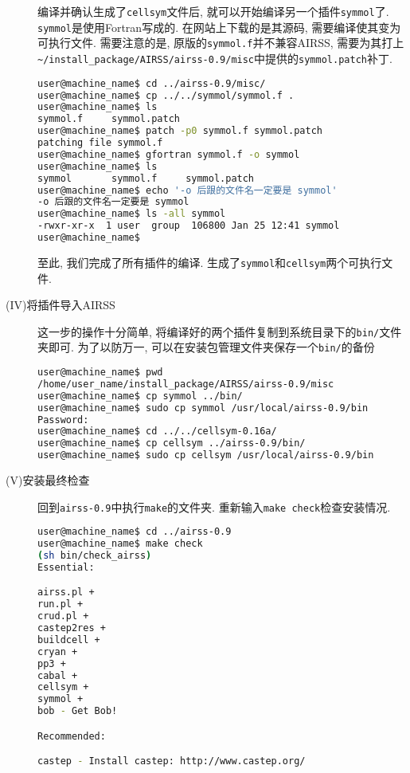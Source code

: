 \documentclass[a4paper, 10pt]{article}
\begin{document}
\begin{description}
        编译并确认生成了\verb|cellsym|文件后, 就可以开始编译另一个插件\verb|symmol|了.
        \verb|symmol|是使用Fortran写成的. 在网站上下载的是其源码, 需要编译使其变为可执行文件.
        需要注意的是, 原版的\verb|symmol.f|并不兼容AIRSS, 需要为其打上\verb|~/install_package/AIRSS/airss-0.9/misc|中提供的\verb|symmol.patch|补丁.
        \begin{lstlisting}[language={bash}]
user@machine_name$ cd ../airss-0.9/misc/
user@machine_name$ cp ../../symmol/symmol.f .
user@machine_name$ ls
symmol.f     symmol.patch
user@machine_name$ patch -p0 symmol.f symmol.patch 
patching file symmol.f
user@machine_name$ gfortran symmol.f -o symmol 
user@machine_name$ ls 
symmol       symmol.f     symmol.patch
user@machine_name$ echo '-o 后跟的文件名一定要是 symmol'
-o 后跟的文件名一定要是 symmol
user@machine_name$ ls -all symmol
-rwxr-xr-x  1 user  group  106800 Jan 25 12:41 symmol
user@machine_name$
        \end{lstlisting}

        至此, 我们完成了所有插件的编译. 生成了\verb|symmol|和\verb|cellsym|两个可执行文件.

        \item[(IV)将插件导入AIRSS]
        这一步的操作十分简单, 将编译好的两个插件复制到系统目录下的\verb|bin/|文件夹即可. 为了以防万一, 可以在安装包管理文件夹保存一个\verb|bin/|的备份
        \begin{lstlisting}[language={bash}]
user@machine_name$ pwd
/home/user_name/install_package/AIRSS/airss-0.9/misc
user@machine_name$ cp symmol ../bin/
user@machine_name$ sudo cp symmol /usr/local/airss-0.9/bin
Password:
user@machine_name$ cd ../../cellsym-0.16a/
user@machine_name$ cp cellsym ../airss-0.9/bin/
user@machine_name$ sudo cp cellsym /usr/local/airss-0.9/bin
        \end{lstlisting}
        
        \item[(V)安装最终检查]
        回到\verb|airss-0.9|中执行\verb|make|的文件夹. 重新输入\verb|make check|检查安装情况.
        \begin{lstlisting}[language={bash}]
user@machine_name$ cd ../airss-0.9
user@machine_name$ make check
(sh bin/check_airss)
Essential:

airss.pl +
run.pl +
crud.pl +
castep2res +
buildcell +
cryan +
pp3 +
cabal +
cellsym +
symmol +
bob - Get Bob!

Recommended:

castep - Install castep: http://www.castep.org/


\end{lstlisting}
\end{description}
\end{document}
